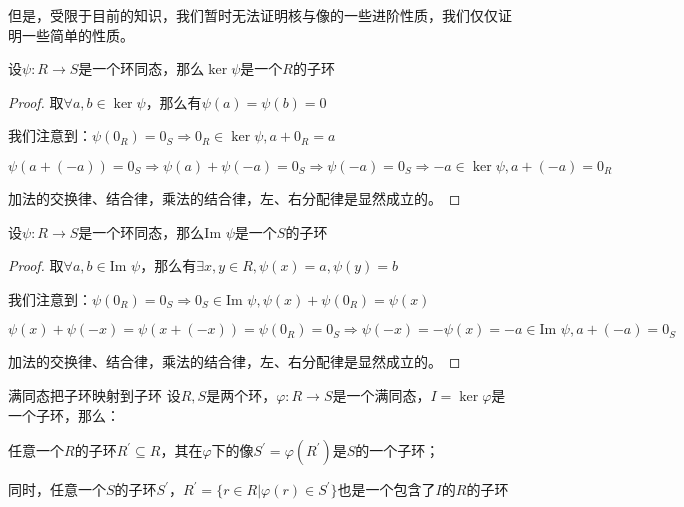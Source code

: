 \documentclass[12pt, a4paper, oneside, UTF8]{ctexbook}
\begin{document}
			但是，受限于目前的知识，我们暂时无法证明核与像的一些进阶性质，我们仅仅证明一些简单的性质。
			\begin{proposition}
				设$\psi :R \rightarrow S$是一个环同态，那么$\ker \psi $是一个$R$的子环
			\end{proposition}
			\begin{proof}
				取$\forall a,b \in \ker \psi$，那么有$\psi (a)=\psi (b)=0$

				我们注意到：$\psi (0_R) = 0_S \Rightarrow 0_R \in \ker \psi ,a +0_R=a$

				$\psi \left(a+(-a)\right)=0_S \Rightarrow \psi (a)+\psi (-a)=0_S \Rightarrow \psi (-a)=0_S \Rightarrow -a \in \ker \psi,a+(-a)=0_R$

				加法的交换律、结合律，乘法的结合律，左、右分配律是显然成立的。
			\end{proof}
			\begin{proposition}
				设$\psi :R \rightarrow S$是一个环同态，那么$\text{Im } \psi $是一个$S$的子环
			\end{proposition}
			\begin{proof}
				取$\forall a,b \in \text{Im } \psi$，那么有$\exists x,y \in R,\psi (x)=a,\psi (y)=b$

				我们注意到：$\psi (0_R) = 0_S \Rightarrow 0_S \in \text{Im } \psi ,\psi (x)+\psi (0_R)=\psi (x)$

				$\psi (x)+\psi (-x)=\psi (x+(-x))=\psi (0_R)=0_S \Rightarrow \psi (-x)=-\psi (x)=-a \in \text{Im } \psi ,a+(-a)=0_S$

				加法的交换律、结合律，乘法的结合律，左、右分配律是显然成立的。
			\end{proof}
			\begin{them}{满同态把子环映射到子环}{}
				设$R,S$是两个环，$\varphi : R \rightarrow S$是一个满同态，$I=\ker \varphi$是一个子环，那么：

				任意一个$R$的子环$R^{\prime} \subseteq R$，其在$\varphi $下的像$S^{\prime}=\varphi (R^{\prime})$是$S$的一个子环；

				同时，任意一个$S$的子环$S^{\prime}$，$R^{\prime}=\{r \in R| \varphi (r) \in S^{\prime}\}$也是一个包含了$I$的$R$的子环
			\end{them}
\end{document}

